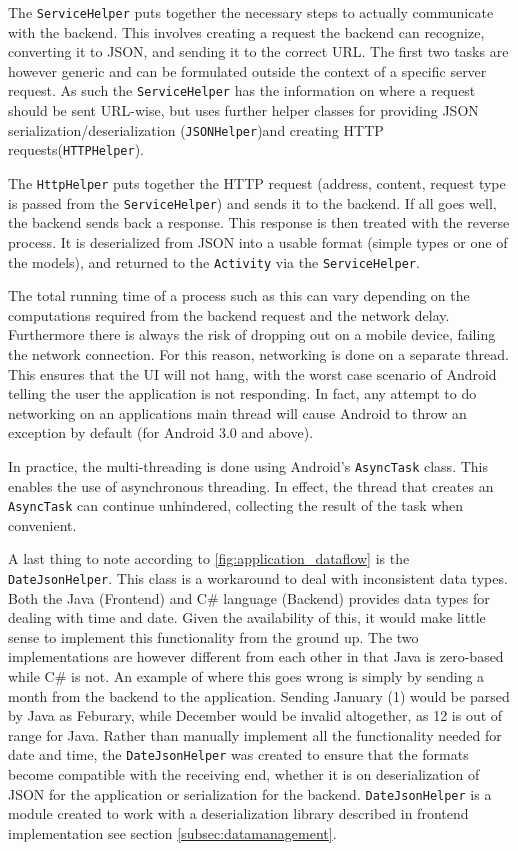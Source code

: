 The \texttt{ServiceHelper} puts together the necessary steps to actually communicate with the backend. This involves creating a request the backend can recognize, converting it to JSON, and sending it to the correct URL. The first two tasks are however generic and can be formulated outside the context of a specific server request. As such the \texttt{ServiceHelper} has the information on where a request should be sent URL-wise, but uses further helper classes for providing JSON serialization/deserialization (\texttt{JSONHelper})and creating HTTP requests(\texttt{HTTPHelper}).

The \texttt{HttpHelper} puts together the HTTP request (address, content, request type is passed from the \texttt{ServiceHelper}) and sends it to the backend. If all goes well, the backend sends back a response. This response is then treated with the reverse process. It is deserialized from JSON into a usable format (simple types or one of the models), and returned to the \texttt{Activity} via the \texttt{ServiceHelper}.

The total running time of a process such as this can vary depending on the computations required from the backend request and the network delay. Furthermore there is always the risk of dropping out on a mobile device, failing the network connection. For this reason, networking is done on a separate thread. This ensures that the UI will not hang, with the worst case scenario of Android telling the user the application is not responding. In fact, any attempt to do networking on an applications main thread will cause Android to throw an exception by default (for Android 3.0 and above)\cite{networking_mainthread}.

In practice, the multi-threading is done using Android's \texttt{AsyncTask} class. This enables the use of asynchronous threading. In effect, the thread that creates an \texttt{AsyncTask} can continue unhindered, collecting the result of the task when convenient\cite{asynctask}.

A last thing to note according to \ref{fig:application_dataflow} is the \texttt{DateJsonHelper}. This class is a workaround to deal with inconsistent data types. Both the Java (Frontend) and C\# language (Backend) provides data types for dealing with time and date. Given the availability of this, it would make little sense to implement this functionality from the ground up. The two implementations are however different from each other in that Java is zero-based while C\# is not. An example of where this goes wrong is simply by sending a month from the backend to the application. Sending January (1) would be parsed by Java as Feburary, while December would be invalid altogether, as 12 is out of range for Java.
Rather than manually implement all the functionality needed for date and time, the \texttt{DateJsonHelper} was created to ensure that the formats become compatible with the receiving end, whether it is on deserialization of JSON for the application or serialization for the backend. \texttt{DateJsonHelper} is a module created to work with a deserialization library described in frontend implementation see section \ref{subsec:datamanagement}.